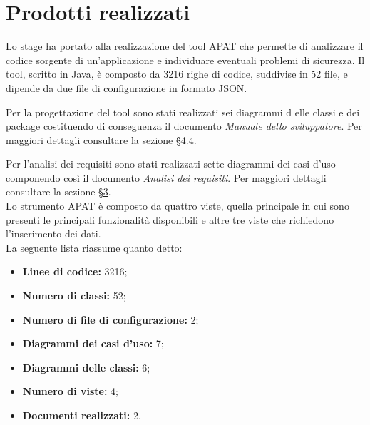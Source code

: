 
\section{Prodotti realizzati}\label{sec:prodotti-ottenuti}
Lo stage ha portato alla realizzazione del tool APAT che permette di analizzare il codice sorgente di un'applicazione e individuare eventuali problemi di sicurezza.
Il tool, scritto in Java, è composto da 3216 righe di codice, suddivise in 52 file, e dipende da due file di configurazione in formato JSON.

Per la progettazione del tool sono stati realizzati sei diagrammi d elle classi e dei package costituendo di conseguenza il documento \textit{Manuale dello sviluppatore}.
Per maggiori dettagli consultare la sezione \hyperref[sec:progettazione]{\S4.4}.

Per l'analisi dei requisiti sono stati realizzati sette diagrammi dei casi d'uso componendo così il documento \textit{Analisi dei requisiti}.
Per maggiori dettagli consultare la sezione \hyperref[ch:analisi-requisiti]{\S3}.\\
Lo strumento APAT è composto da quattro viste, quella principale in cui sono presenti le principali funzionalità disponibili e altre tre viste che richiedono l'inserimento dei dati.\\
La seguente lista riassume quanto detto:

\begin{itemize}
    \item \textbf{Linee di codice:} 3216;
    \item \textbf{Numero di classi:} 52;
    \item \textbf{Numero di file di configurazione:} 2;
    \item \textbf{Diagrammi dei casi d'uso:} 7;
    \item \textbf{Diagrammi delle classi:} 6;
    \item \textbf{Numero di viste:} 4;
    \item \textbf{Documenti realizzati:} 2.
\end{itemize}